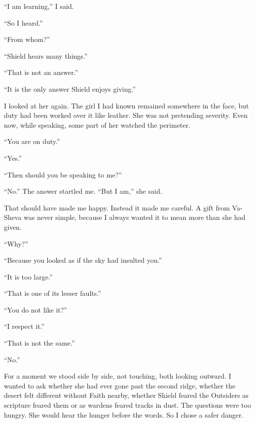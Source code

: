 ``I am learning,'' I said.\par

``So I heard.''\par

``From whom?''\par

``Shield hears many things.''\par

``That is not an answer.''\par

``It is the only answer Shield enjoys giving.''\par

I looked at her again. The girl I had known remained somewhere in the face, but duty had been worked over it like leather. She was not pretending severity. Even now, while speaking, some part of her watched the perimeter.\par

``You are on duty.''\par

``Yes.''\par

``Then should you be speaking to me?''\par

``No.'' The answer startled me. ``But I am,'' she said.\par

That should have made me happy. Instead it made me careful. A gift from Va-Sheva was never simple, because I always wanted it to mean more than she had given.\par

``Why?''\par

``Because you looked as if the sky had insulted you.''\par

``It is too large.''\par

``That is one of its lesser faults.''\par

``You do not like it?''\par

``I respect it.''\par

``That is not the same.''\par

``No.''\par

For a moment we stood side by side, not touching, both looking outward. I wanted to ask whether she had ever gone past the second ridge, whether the desert felt different without Faith nearby, whether Shield feared the Outsiders as scripture feared them or as wardens feared tracks in dust. The questions were too hungry. She would hear the hunger before the words. So I chose a safer danger.\par

